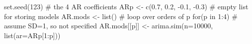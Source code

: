 \begin{Schunk}
\begin{Sinput}
 set.seed(123)
 # the 4 AR coefficients
 ARp <- c(0.7, 0.2, -0.1, -0.3)
 # empty list for storing models
 AR.mods <- list()
 # loop over orders of p
 for(p in 1:4) {
   # assume SD=1, so not specified
   AR.mods[[p]] <- arima.sim(n=10000, list(ar=ARp[1:p]))
 }
\end{Sinput}
\end{Schunk}
